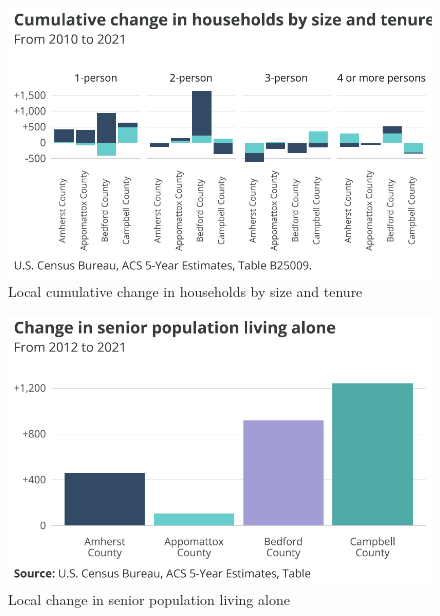 \documentclass[
  letterpaper,
  DIV=11,
  numbers=noendperiod]{scrreprt}
\begin{document}
\begin{figure}[H]

{\centering \includegraphics{./part-3-2_files/figure-pdf/fig-localsize-1.pdf}

}

\caption{\label{fig-localsize}Local cumulative change in households by
size and tenure}

\end{figure}

\begin{figure}[H]

{\centering \includegraphics{./part-3-2_files/figure-pdf/fig-localsenior-1.pdf}

}

\caption{\label{fig-localsenior}Local change in senior population living
alone}

\end{figure}
\end{document}
